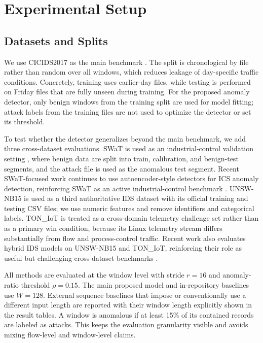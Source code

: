\documentclass[conference]{IEEEtran}
\begin{document}
\section{Experimental Setup}
\subsection{Datasets and Splits}
We use CICIDS2017 as the main benchmark \cite{sharafaldin2018cicids}. The split is chronological by file rather than random over all windows, which reduces leakage of day-specific traffic conditions. Concretely, training uses earlier-day files, while testing is performed on Friday files that are fully unseen during training. For the proposed anomaly detector, only benign windows from the training split are used for model fitting; attack labels from the training files are not used to optimize the detector or set its threshold.

To test whether the detector generalizes beyond the main benchmark, we add three cross-dataset evaluations. SWaT is used as an industrial-control validation setting \cite{goh2016swat}, where benign data are split into train, calibration, and benign-test segments, and the attack file is used as the anomalous test segment. Recent SWaT-focused work continues to use autoencoder-style detectors for ICS anomaly detection, reinforcing SWaT as an active industrial-control benchmark \cite{aslam2024improvedaeics}. UNSW-NB15 \cite{moustafa2015unsw} is used as a third authoritative IDS dataset with its official training and testing CSV files; we use numeric features and remove identifiers and categorical labels. TON\_IoT \cite{alsaedi2020toniot} is treated as a cross-domain telemetry challenge set rather than as a primary win condition, because its Linux telemetry stream differs substantially from flow and process-control traffic. Recent work also evaluates hybrid IDS models on UNSW-NB15 and TON\_IoT, reinforcing their role as useful but challenging cross-dataset benchmarks \cite{chavan2025hybrid}.

All methods are evaluated at the window level with stride $r=16$ and anomaly-ratio threshold $\rho=0.15$. The main proposed model and in-repository baselines use $W=128$. External sequence baselines that impose or conventionally use a different input length are reported with their window length explicitly shown in the result tables. A window is anomalous if at least 15\% of its contained records are labeled as attacks. This keeps the evaluation granularity visible and avoids mixing flow-level and window-level claims.
\end{document}
